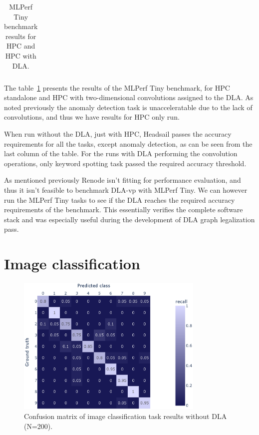 \documentclass[12pt,a4paper,english
]{tunithesis}
\begin{document}
\begin{table}[h]
\begin{tabular}{|l|l|c|c|c|c|}
\end{tabular}
\caption{MLPerf Tiny benchmark results for HPC and HPC with DLA.}
\label{tab:benchmark-results}
\end{table}

The table~\ref{tab:benchmark-results} presents the results of the MLPerf Tiny benchmark, for HPC standalone and HPC with two-dimensional convolutions assigned to the DLA. As noted previously the anomaly detection task is unacceleratable due to the lack of convolutions, and thus we have results for HPC only run.

When run without the DLA, just with HPC, Headsail passes the accuracy requirements for all the tasks, except anomaly detection, as can be seen from the last column of the table.
For the runs with DLA performing the convolution operations, only keyword spotting task passed the required accuracy threshold.

As mentioned previously Renode isn't fitting for performance evaluation, and thus it isn't feasible to benchmark DLA-vp with MLPerf Tiny. We can however run the MLPerf Tiny tasks to see if the DLA reaches the required accuracy requirements of the benchmark. This essentially verifies the complete software stack and was especially useful during the development of DLA graph legalization pass.

\section{Image classification}
\begin{figure}[h]
  \centering
  \includegraphics[width=0.8\textwidth]{img/ic_200_no_acc.eps}
  \caption{Confusion matrix of image classification task results without DLA (N=200).}
  \label{fig:ic-results-no-acc}
\end{figure}
\end{document}
